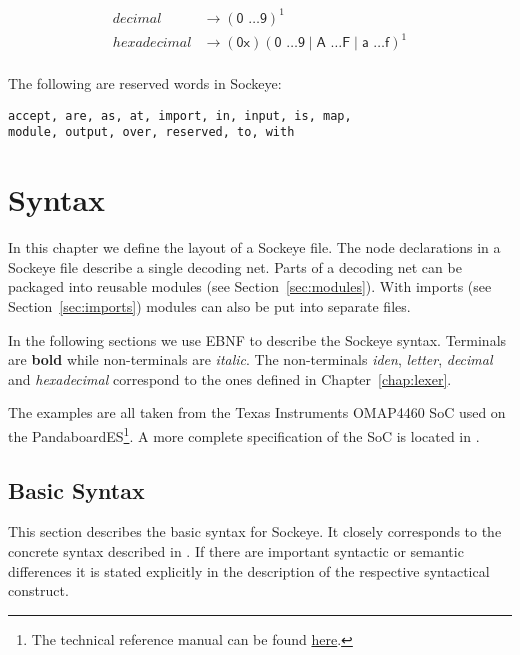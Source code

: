 \documentclass[a4paper,11pt,twoside]{report}
\begin{document}
{{{\begin{description}
\begin{align*}
decimal & \rightarrow (\textsf{0 \ldots 9})^{\textrm{1}}\\
hexadecimal & \rightarrow (\textsf{0x})(\textsf{0 \ldots 9} \mid \textsf{A \ldots F} \mid \textsf{a \ldots f})^{\textrm{1}}\\
\end{align*}

\item[Reserved words:] The following are reserved words in Sockeye:
\begin{verbatim}
accept, are, as, at, import, in, input, is, map,
module, output, over, reserved, to, with
\end{verbatim}

\end{description}


\chapter{Syntax}
\label{chap:declaration}

In this chapter we define the layout of a Sockeye file.
The node declarations in a Sockeye file describe a single decoding net.
Parts of a decoding net can be packaged into reusable modules (see Section~\ref{sec:modules}).
With imports (see Section~\ref{sec:imports}) modules can also be put into separate files.

In the following sections we use EBNF to describe the Sockeye syntax. Terminals are \textbf{bold} while non-terminals are \textit{italic}.
The non-terminals \textit{iden}, \textit{letter}, \textit{decimal} and \textit{hexadecimal} correspond to the ones defined in Chapter~\ref{chap:lexer}.

The examples are all taken from the Texas Instruments OMAP4460 SoC used on the PandaboardES\footnote{The technical reference manual can be found \href{http://www.
ti.com/lit/ug/swpu235ab/swpu235ab.pdf}{here}.}.
A more complete specification of the SoC is located in .

\section{Basic Syntax}
This section describes the basic syntax for Sockeye.
It closely corresponds to the concrete syntax described in \cite{achermann:mars17}.
If there are important syntactic or semantic differences it is stated explicitly in the description of the respective syntactical construct.

}}}
\end{document}
